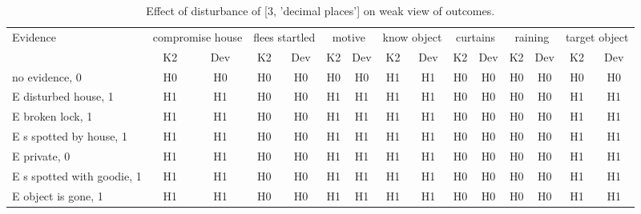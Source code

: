 \begin{table}\begin{tabular}{l|cc|cc|cc|cc|cc|cc|cc}\toprule\multirow{2}{*}{Evidence} & \multicolumn{2}{c}{compromise house}& \multicolumn{2}{c}{flees startled}& \multicolumn{2}{c}{motive}& \multicolumn{2}{c}{know object}& \multicolumn{2}{c}{curtains}& \multicolumn{2}{c}{raining}& \multicolumn{2}{c}{target object}\\& {K2} & {Dev}& {K2} & {Dev}& {K2} & {Dev}& {K2} & {Dev}& {K2} & {Dev}& {K2} & {Dev}& {K2} & {Dev}\\\midrule
no evidence, 0 & H0&H0&H0&H0&H0&H0&H1&H1&H0&H0&H0&H0&H0&H0\\E disturbed house, 1 & H1&H1&H0&H0&H1&H1&H1&H1&H0&H0&H0&H0&H1&H1\\E broken lock, 1 & H1&H1&H0&H0&H1&H1&H1&H1&H0&H0&H0&H0&H1&H1\\E s spotted by house, 1 & H1&H1&H0&H0&H1&H1&H1&H1&H0&H0&H0&H0&H1&H1\\E private, 0 & H1&H1&H0&H0&H1&H1&H1&H1&H0&H0&H0&H0&H1&H1\\E s spotted with goodie, 1 & H1&H1&H0&H0&H1&H1&H1&H1&H0&H0&H0&H0&H1&H1\\E object is gone, 1 & H1&H1&H0&H0&H1&H1&H1&H1&H0&H0&H0&H0&H1&H1\\\bottomrule\end{tabular}\caption{Effect of disturbance of [3, 'decimal places'] on weak view of outcomes.}\end{table}